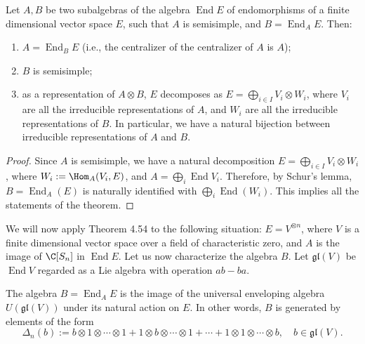 
\begin{theorem}
Let $A,B$ be two subalgebras of the algebra $\operatorname{End}E$ of endomorphisms of a finite dimensional vector space $E$, such that $A$ is semisimple, and $B=\operatorname{End}_A E$. Then:
\begin{enumerate}[label=(\roman*)]
\item $A=\operatorname{End}_B E$ (i.e., the centralizer of the centralizer of $A$ is $A$);
\item $B$ is semisimple;
\item as a representation of $A\otimes B$, $E$ decomposes as $E=\bigoplus_{i\in I}V_i\otimes W_i$, where $V_i$ are all the irreducible representations of $A$, and $W_i$ are all the irreducible representations of $B$. In particular, we have a natural bijection between irreducible representations of $A$ and $B$.
\end{enumerate}
\end{theorem}
\begin{proof}
Since $A$ is semisimple, we have a natural decomposition $E=\bigoplus_{i\in I}V_i\otimes W_i$, where $W_i:=\Hom_A(V_i,E)$, and $A=\bigoplus_i\operatorname{End}V_i$. Therefore, by Schur's lemma, $B=\operatorname{End}_A(E)$ is naturally identified with $\bigoplus_i\operatorname{End}(W_i)$. This implies all the statements of the theorem.
\end{proof}
We will now apply Theorem 4.54 to the following situation: $E=V^{\otimes n}$, where $V$ is a finite dimensional vector space over a field of characteristic zero, and $A$ is the image of $\C[S_n]$ in $\operatorname{End}E$. Let us now characterize the algebra $B$. Let $\mathfrak{gl}(V)$ be $\operatorname{End}V$ regarded as a Lie algebra with operation $ab-ba$.
\begin{theorem}[4.55]
The algebra $B=\operatorname{End}_A E$ is the image of the universal enveloping algebra $U(\mathfrak{gl}(V))$ under its natural action on $E$. In other words, $B$ is generated by elements of the form
\[
\Delta_n(b):=b\otimes1\otimes\cdots\otimes1+1\otimes b\otimes\cdots\otimes1+\cdots+1\otimes1\otimes\cdots\otimes b,
\quad b\in\mathfrak{gl}(V).
\]
\end{theorem}
